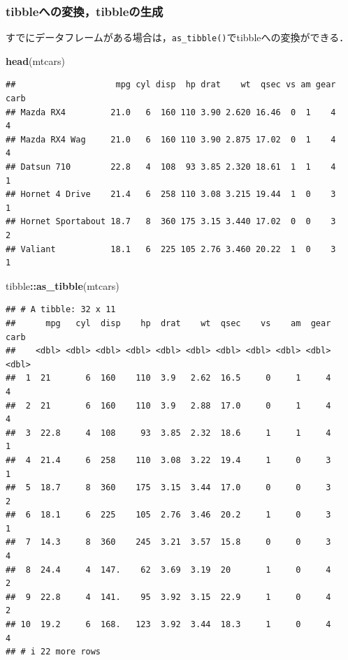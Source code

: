\documentclass[
]{article}
\newenvironment{Shaded}{\begin{snugshade}}{\end{snugshade}}
\newcommand{\FunctionTok}[1]{\textcolor[rgb]{0.13,0.29,0.53}{\textbf{#1}}}
\newcommand{\NormalTok}[1]{#1}
\newcommand{\SpecialCharTok}[1]{\textcolor[rgb]{0.81,0.36,0.00}{\textbf{#1}}}
\begin{document}
\hypertarget{tibbleux3078ux306eux5909ux63dbtibbleux306eux751fux6210}{%
\subsubsection{tibbleへの変換，tibbleの生成}\label{tibbleux3078ux306eux5909ux63dbtibbleux306eux751fux6210}}

すでにデータフレームがある場合は，\texttt{as\_tibble()}でtibbleへの変換ができる．

\begin{Shaded}
\begin{Highlighting}[]
\FunctionTok{head}\NormalTok{(mtcars)}
\end{Highlighting}
\end{Shaded}

\begin{verbatim}
##                    mpg cyl disp  hp drat    wt  qsec vs am gear carb
## Mazda RX4         21.0   6  160 110 3.90 2.620 16.46  0  1    4    4
## Mazda RX4 Wag     21.0   6  160 110 3.90 2.875 17.02  0  1    4    4
## Datsun 710        22.8   4  108  93 3.85 2.320 18.61  1  1    4    1
## Hornet 4 Drive    21.4   6  258 110 3.08 3.215 19.44  1  0    3    1
## Hornet Sportabout 18.7   8  360 175 3.15 3.440 17.02  0  0    3    2
## Valiant           18.1   6  225 105 2.76 3.460 20.22  1  0    3    1
\end{verbatim}

\begin{Shaded}
\begin{Highlighting}[]
\NormalTok{tibble}\SpecialCharTok{::}\FunctionTok{as\_tibble}\NormalTok{(mtcars)}
\end{Highlighting}
\end{Shaded}

\begin{verbatim}
## # A tibble: 32 x 11
##      mpg   cyl  disp    hp  drat    wt  qsec    vs    am  gear  carb
##    <dbl> <dbl> <dbl> <dbl> <dbl> <dbl> <dbl> <dbl> <dbl> <dbl> <dbl>
##  1  21       6  160    110  3.9   2.62  16.5     0     1     4     4
##  2  21       6  160    110  3.9   2.88  17.0     0     1     4     4
##  3  22.8     4  108     93  3.85  2.32  18.6     1     1     4     1
##  4  21.4     6  258    110  3.08  3.22  19.4     1     0     3     1
##  5  18.7     8  360    175  3.15  3.44  17.0     0     0     3     2
##  6  18.1     6  225    105  2.76  3.46  20.2     1     0     3     1
##  7  14.3     8  360    245  3.21  3.57  15.8     0     0     3     4
##  8  24.4     4  147.    62  3.69  3.19  20       1     0     4     2
##  9  22.8     4  141.    95  3.92  3.15  22.9     1     0     4     2
## 10  19.2     6  168.   123  3.92  3.44  18.3     1     0     4     4
## # i 22 more rows
\end{verbatim}
\end{document}
